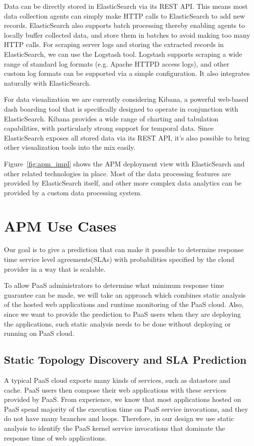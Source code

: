 \documentclass[11pt]{article}
\begin{document}
Data can be directly stored in ElasticSearch via its REST API. This means most data collection agents can 
simply make HTTP calls to ElasticSearch to add new records. ElasticSearch also supports batch 
processing thereby enabling agents to locally buffer collected data, and store them in batches to avoid
making too many HTTP calls. For scraping server logs and storing the extracted records in ElasticSearch,
we can use the Logstash tool. Logstash supports scraping a wide range of standard log formats (e.g. 
Apache HTTPD access logs), and other custom log formats can be supported via a simple configuration.
It also integrates naturally with ElasticSearch.

For data visualization we are currently considering Kibana, a powerful web-based dash boarding tool 
that is specifically designed to operate in conjunction with ElasticSearch. Kibana provides a wide
range of charting and tabulation capabilities, with particularly strong support for temporal data.  Since
ElasticSearch exposes all stored data via its REST API, it's also possible to bring other visualization
tools into the mix easily.

Figure~\ref{fig:apm_impl} shows the APM deployment view with ElasticSearch and other related technologies
in place. Most of the data processing features are provided by ElasticSearch itself, and other more complex
data analytics can be provided by a custom data processing system. 

\section{APM Use Cases}
Our goal is to give a prediction that can make it possible to determine response time service level agreements(SLAs)
with probabilities specified by the cloud provider in a way that is scalable.

To allow PaaS administrators to determine what minimum response time guarantee can be made,
we will take an approach which combines static analysis of the hosted web applications and runtime monitoring of the PaaS cloud. 
Also, since we want to provide the prediction to PaaS users when they are deploying the applications,
such static analysis needs to be done without deploying or running on PaaS cloud. 

\subsection{Static Topology Discovery and SLA Prediction}
A typical PaaS cloud exports many kinds of services, such as datastore and cache. PaaS users then compose their web applications
with these services provided by PaaS. From experience, we know that most applications hosted on PaaS spend majority of
the execution time on PaaS service invocations, and they do not have many branches and loops. Therefore, in our design we use
static analysis to identify the PaaS kernel service invocations that dominate the response time of web applications.
\end{document}
